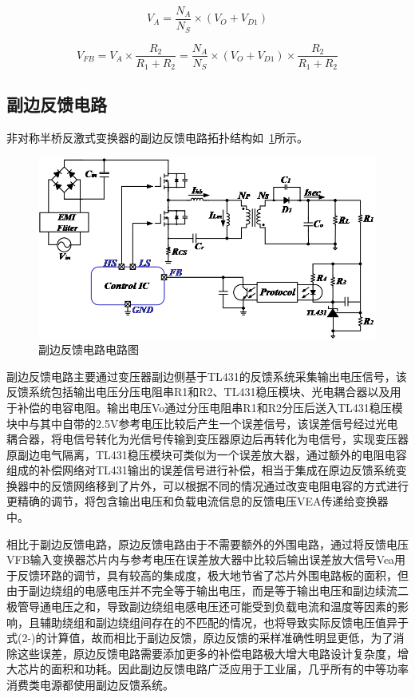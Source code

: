 \begin{equation}
    \label{eq:辅助绕组电压}
    V_A = \frac{N_A}{N_S}\times(V_O + V_{D1})
\end{equation}

\begin{equation}
    \label{eq:VFB公式}
    V_{FB} = V_A\times\frac{R_2}{R_1+R_2}=\frac{N_A}{N_S}\times(V_O + V_{D1})\times\frac{R_2}{R_1+R_2}
\end{equation}

\subsection{副边反馈电路}
非对称半桥反激式变换器的副边反馈电路拓扑结构如~\ref{fig:副边反馈电路电路图}所示。

\begin{figure}[htbp] 
    \centering
    \includegraphics[width=0.8\linewidth]{figures/副边反馈电路图.png}
    \caption{副边反馈电路电路图}
    \label{fig:副边反馈电路电路图}
\end{figure}

副边反馈电路主要通过变压器副边侧基于TL431的反馈系统采集输出电压信号，该反馈系统包括输出电压分压电阻串R1和R2、TL431稳压模块、光电耦合器以及用于补偿的电容电阻。输出电压Vo通过分压电阻串R1和R2分压后送入TL431稳压模块中与其中自带的2.5V参考电压比较后产生一个误差信号，该误差信号经过光电耦合器，将电信号转化为光信号传输到变压器原边后再转化为电信号，实现变压器原副边电气隔离，TL431稳压模块可类似为一个误差放大器，通过额外的电阻电容组成的补偿网络对TL431输出的误差信号进行补偿，相当于集成在原边反馈系统变换器中的反馈网络移到了片外，可以根据不同的情况通过改变电阻电容的方式进行更精确的调节，将包含输出电压和负载电流信息的反馈电压VEA传递给变换器中。

相比于副边反馈电路，原边反馈电路由于不需要额外的外围电路，通过将反馈电压VFB输入变换器芯片内与参考电压在误差放大器中比较后输出误差放大信号Vea用于反馈环路的调节，具有较高的集成度，极大地节省了芯片外围电路板的面积，但由于副边绕组的电感电压并不完全等于输出电压，而是等于输出电压和副边续流二极管导通电压之和，导致副边绕组电感电压还可能受到负载电流和温度等因素的影响，且辅助绕组和副边绕组间存在的不匹配的情况，也将导致实际反馈电压值异于式(2-)的计算值，故而相比于副边反馈，原边反馈的采样准确性明显更低，为了消除这些误差，原边反馈电路需要添加更多的补偿电路极大增大电路设计复杂度，增大芯片的面积和功耗。因此副边反馈电路广泛应用于工业届，几乎所有的中等功率消费类电源都使用副边反馈系统。



 






















